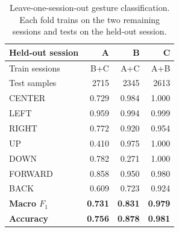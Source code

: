 \begin{table}[t]
\caption{Leave-one-session-out gesture classification. Each fold trains on the two remaining sessions and tests on the held-out session.}
\label{tab:loso}
\centering
\footnotesize
\setlength{\tabcolsep}{4pt}
\renewcommand{\arraystretch}{1.02}
\begin{tabular}{@{}lrrr@{}}
\toprule
Held-out session & A & B & C \\
\midrule
Train sessions & B+C & A+C & A+B \\
Test samples & 2715 & 2345 & 2613 \\
\midrule
CENTER & 0.729 & 0.984 & 1.000 \\
LEFT & 0.959 & 0.994 & 0.999 \\
RIGHT & 0.772 & 0.920 & 0.954 \\
UP & 0.410 & 0.975 & 1.000 \\
DOWN & 0.782 & 0.271 & 1.000 \\
FORWARD & 0.858 & 0.950 & 0.980 \\
BACK & 0.609 & 0.723 & 0.924 \\
\midrule
\textbf{Macro $F_1$} & \textbf{0.731} & \textbf{0.831} & \textbf{0.979}\\
\textbf{Accuracy} & \textbf{0.756} & \textbf{0.878} & \textbf{0.981}\\
\bottomrule
\end{tabular}
\end{table}
